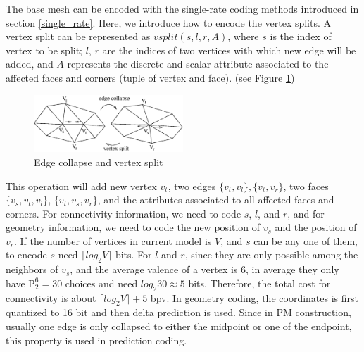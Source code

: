 \documentclass[11pt, a4paper]{report}
\begin{document}
    The base mesh can be encoded with the single-rate coding methods
    introduced in section \ref{single_rate}. Here, we introduce
    how to encode the vertex splits. A vertex split can be represented
    as $vsplit(s, l, r ,A)$, where $s$ is the index of vertex to be
    split; $l$, $r$ are the indices of two vertices with which new
    edge will be added, and $A$ represents the discrete and scalar
    attribute associated to the affected faces and corners (tuple of
    vertex and face). (see Figure \ref{split2})
\begin{figure}
\centering
\includegraphics[width=0.5\textwidth]{split2.eps}
\caption{Edge collapse and vertex split}\label{split2}
\end{figure}
    This operation will add new vertex $v_{t}$, two
    edges $\{v_{t}, v_{l}\}, \{v_{t}, v_{r}\}$, two faces $\{v_{s},
    v_{t}, v_{l}\}$, $\{v_{t}, v_{s}, v_{r}\}$, and the attributes
    associated to all affected faces and corners. For connectivity
    information, we need to code $s$, $l$, and $r$, and for geometry
    information, we need to code the new position of $v_{s}$ and the
    position of $v_{r}$. If the number of vertices in current model is
    $V$, and $s$ can be any one of them, to encode $s$ need
    ${\lceil}log_{2}V{\rceil}$ bits. For $l$ and $r$, since they are
    only possible among the neighbors of $v_{s}$, and the average
    valence of a vertex is 6, in average they only have $\mathrm{P}_{2}^{6} =
    30$ choices and need $log_{2}30 \approx 5$ bits. Therefore, the total
    cost for connectivity is about ${\lceil}log_{2}V{\rceil} + 5$ bpv.
    In geometry coding, the coordinates is first quantized to 16 bit
    and then delta prediction is used. Since in PM construction, usually one
    edge is only collapsed to either the midpoint or one of the
    endpoint, this property is used in prediction coding.
\end{document}
